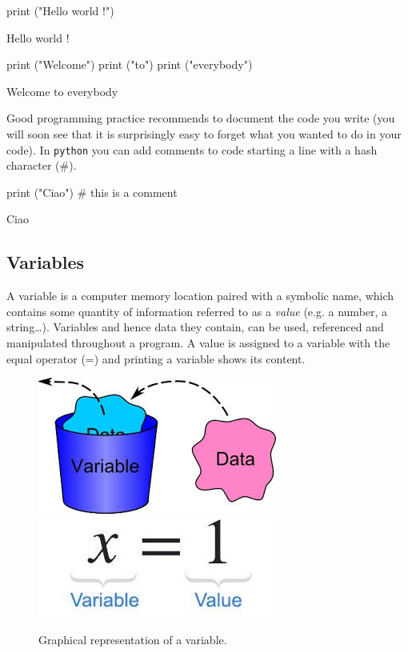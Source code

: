 \begin{ipython}
print ("Hello world !")
\end{ipython}
\begin{ioutput}
Hello world !
\end{ioutput}
\begin{ipython}
print ("Welcome")
print ("to")
print ("everybody")
\end{ipython}
\begin{ioutput}
Welcome
to
everybody
\end{ioutput}

Good programming practice recommends to document the code you write (you will soon see that it is surprisingly easy to forget what you wanted to do in your code). In \texttt{python} you can add comments to code starting a line with a hash character (\#).

\begin{ipython}
print ("Ciao") # this is a comment 
\end{ipython}
\begin{ioutput}
Ciao
\end{ioutput}

\subsection{Variables}\label{variables}

A variable is a computer memory location paired with a symbolic name, which contains some quantity of information referred to as a \emph{value} (e.g. a number, a string\ldots). Variables and hence data they contain, can be used, referenced and manipulated throughout a program.
A value is assigned to a variable with the equal operator (=) and printing a variable shows its content. 

\begin{figure}[h]
\centering
\includegraphics[width=0.35\linewidth]{figures/var1.jpeg}\\
\includegraphics[width=0.35\linewidth]{figures/var2.jpeg}
\caption{Graphical representation of a variable.}
\end{figure}

